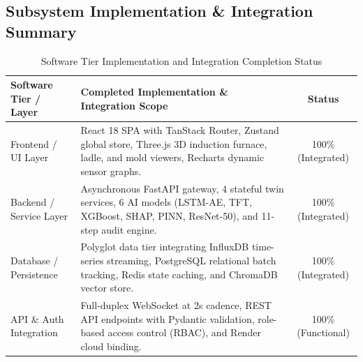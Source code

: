 \documentclass[11pt, a4paper]{article}
\begin{document}
\subsection{Subsystem Implementation \& Integration Summary}
\begin{table}[H]
    \centering
    \footnotesize
    \renewcommand{\arraystretch}{1.25}
    \begin{tabular}{|p{3.5cm}|p{7.8cm}|c|}
        \hline
        \textbf{Software Tier / Layer} & \textbf{Completed Implementation \& Integration Scope} & \textbf{Status} \\
        \hline
        Frontend / UI Layer & React 18 SPA with TanStack Router, Zustand global store, Three.js 3D induction furnace, ladle, and mold viewers, Recharts dynamic sensor graphs. & 100\% (Integrated) \\
        \hline
        Backend / Service Layer & Asynchronous FastAPI gateway, 4 stateful twin services, 6 AI models (LSTM-AE, TFT, XGBoost, SHAP, PINN, ResNet-50), and 11-step audit engine. & 100\% (Integrated) \\
        \hline
        Database / Persistence & Polyglot data tier integrating InfluxDB time-series streaming, PostgreSQL relational batch tracking, Redis state caching, and ChromaDB vector store. & 100\% (Integrated) \\
        \hline
        API \& Auth Integration & Full-duplex WebSocket at 2s cadence, REST API endpoints with Pydantic validation, role-based access control (RBAC), and Render cloud binding. & 100\% (Functional) \\
        \hline
    \end{tabular}
    \caption{Software Tier Implementation and Integration Completion Status}
\end{table}
\end{document}
